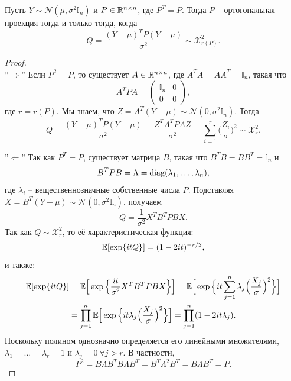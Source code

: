 \begin{thm}
	Пусть $Y \sim \mathcal{N}(\mu,\sigma^2 \mathbb{I}_n)$ и $P \in \mathbb{R}^{n \times n}$, где $P^T=P$. Тогда $P$ -- ортогональная проекция тогда и только тогда, когда
	\[ Q = \frac{(Y - \mu)^T P (Y - \mu)}{\sigma^2} \sim \mathcal{X}_{r(P)}^2. \]
\end{thm}
\begin{proof} \\
	
	''$\Longrightarrow$'' Если $P^2 = P$, то существует $A \in \mathbb{R}^{n \times n}$, где $A^TA = AA^T = \mathbb{I}_n$, такая что
	\[ A^TPA = \begin{pmatrix}
	\mathbb{I}_n & 0 \\
	0 & 0
	\end{pmatrix}, \]
	где $r = r(P)$. Мы знаем, что $Z = A^T(Y-\mu) \sim \mathcal{N}(0, \sigma^2 \mathbb{I}_n)$. Тогда
	\[ Q = \frac{(Y-\mu)^TP(Y-\mu)}{\sigma^2} = \frac{Z^TA^TPAZ}{\sigma^2} = \sum_{i=1}^{r}\Big( \frac{Z_i}{\sigma} \Big)^2 \sim \mathcal{X}_r^2.   \]
	
	''$\Longleftarrow$'' Так как $P^T=P$, существует матрица $B$, такая что $B^TB=BB^T=\mathbb{I}_n$ и
	\[ B^TPB = \Lambda = \mathrm{diag}(\lambda_1, \dots, \lambda_n),  \]
	где $\lambda_i$ -- вещественнозначные собственные числа $P$. Подставляя $X = B^T(Y-\mu) \sim \mathcal{N}(0, \sigma^2 \mathbb{I}_n )$, получаем
	\[ Q = \frac{1}{\sigma^2} X^TB^TPBX. \]
	Так как $Q \sim \mathcal{X}_r^2$, то её характеристическая функция:
	\[ \mathbb{E}[\exp\{itQ\}] = (1-2it)^{-r/2}, \]
	и также:
	\[ \begin{aligned}
	\mathbb{E}[\exp\{itQ\}] & = \mathbb{E} \Big[ \exp\Big\{ \frac{it}{\sigma^2} X^TB^TPBX \Big\}\Big] = \mathbb{E} \Big[ \exp\Big\{ it \sum_{j=1}^n \lambda_j \Big( \frac{X_j}{\sigma} \Big)^2 \Big\}\Big] \\
	& = \prod_{j=1}^{n} \mathbb{E} \Big[ \exp\Big\{it \lambda_j \Big( \frac{X_j}{\sigma} \Big)^2 \Big \}\Big] = \prod_{j=1}^{n} (1 - 2it\lambda_j).
	\end{aligned} \]
	Поскольку полином однозначно определяется его линейными множителями, $\lambda_1 = \dots = \lambda_r = 1$ и $\lambda_j = 0 \ \forall j > r$. В частности,
	\[ P^2 = B\Lambda B^T B\Lambda B^T = B^T \Lambda^2 B^T= B\Lambda B^T = P. \]
\end{proof}

